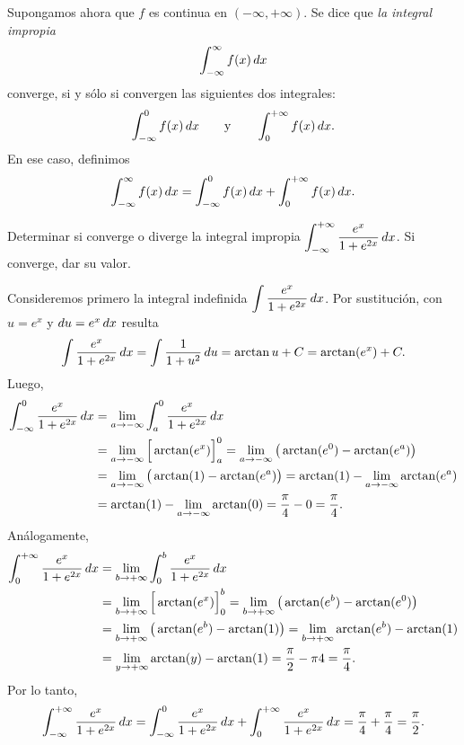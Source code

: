 \begin{definition}
Supongamos ahora que $f$ es continua en $(-\infty,+\infty)$. Se dice que \emph{la integral impropia}
\[
\int_{-\infty}^{\infty} f(x)\,dx
\]  
converge, si y sólo si convergen las siguientes dos integrales:
\[
\int_{-\infty}^{0} f(x)\,dx
\qquad\text{y}\qquad
\int_{0}^{+\infty} f(x)\,dx.
\]  
En ese caso, definimos
\[
\int_{-\infty}^{\infty} f(x)\,dx = 
\int_{-\infty}^{0} f(x)\,dx
+
\int_{0}^{+\infty} f(x)\,dx.
\]  
\end{definition}

\begin{example}
  Determinar si converge o diverge la integral impropia $\displaystyle \int_{-\infty}^{+\infty} \frac{e^x}{1+e^{2x}}\,dx$. Si converge, dar su valor.

  Consideremos primero la integral indefinida $\displaystyle \int \frac{e^x}{1+e^{2x}}\,dx$. Por sustitución, con $u=e^x$ y $du = e^x\,dx$ resulta
  \[
  \int \frac{e^x}{1+e^{2x}}\,dx = \int \frac1{1+u^2}\,du
  = \arctan u + C = \arctan(e^x) + C.
  \]
  Luego, 
  \begin{align*}
  \int_{-\infty}^{0}  \frac{e^x}{1+e^{2x}}\,dx 
  &= 
  \lim_{a\to-\infty}\int_{a}^{0}  \frac{e^x}{1+e^{2x}}\,dx 
  \\
  &= 
  \lim_{a\to-\infty}\Big[\arctan(e^x)\Big]_{a}^{0}
  = \lim_{a\to-\infty}\big( \arctan(e^0)-\arctan(e^a) \big)
  \\
  &= \lim_{a\to-\infty} \big( \arctan(1) -\arctan(e^a) \big)
  = \arctan(1) - \lim_{a\to-\infty}\arctan(e^a)  
  \\
  &= \arctan(1) - \lim_{a\to-\infty}\arctan(0)
  = \frac\pi4 - 0 = \frac\pi4.
  \end{align*}
  Análogamente,
  \begin{align*}
  \int_{0}^{+\infty}  \frac{e^x}{1+e^{2x}}\,dx 
  &= 
  \lim_{b\to+\infty}\int_{0}^{b}  \frac{e^x}{1+e^{2x}}\,dx 
  \\
  &= 
  \lim_{b\to+\infty}\Big[\arctan(e^x)\Big]_{0}^{b}
  = \lim_{b\to+\infty}\big( \arctan(e^b)-\arctan(e^0) \big)
  \\
  &= \lim_{b\to+\infty} \big( \arctan(e^b) -\arctan(1) \big)
  =  \lim_{b\to+\infty}\arctan(e^b)  - \arctan(1)
  \\
  &= \lim_{y\to+\infty}\arctan(y) - \arctan(1)
  = \frac\pi2 - \pi4 = \frac\pi4.
  \end{align*}
  Por lo tanto,
  \[
  \int_{-\infty}^{+\infty} \frac{e^x}{1+e^{2x}}\,dx
  = \int_{-\infty}^{0} \frac{e^x}{1+e^{2x}}\,dx + \int_{0}^{+\infty} \frac{e^x}{1+e^{2x}}\,dx 
  = \frac{\pi}4 + \frac{\pi}4 = \frac{\pi}2.
  \]
\end{example}

